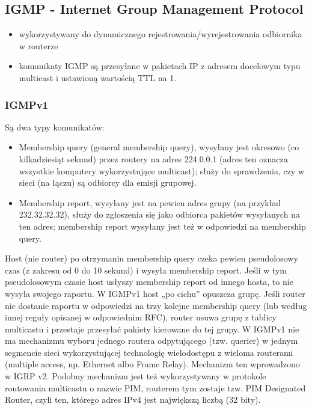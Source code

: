 \documentclass[../main.tex]{subfiles}
\begin{document}
    \subsection{IGMP - Internet Group Management Protocol}
    \begin{itemize}
        \item wykorzystywany do dynamicznego rejestrowania/wyrejestrowania
        odbiornika w routerze
        \item komunikaty IGMP są przesyłane w pakietach IP z adresem docelowym typu multicast i
        ustawioną wartością TTL na 1.
    \end{itemize}


    \subsubsection{IGMPv1}

    Są dwa typy komunikatów:
    \begin{itemize}
        \item Membership query (general membership query), wysyłany jest okresowo (co
        kilkadziesiąt sekund) przez routery na adres 224.0.0.1 (adres ten oznacza wszystkie
        komputery wykorzystujące multicast); służy do sprawdzenia, czy w sieci (na łączu) są
        odbiorcy dla emisji grupowej.
        \item Membership report, wysyłany jest na pewien adres grupy (na przykład 232.32.32.32),
        służy do zgłoszenia się jako odbiorca pakietów wysyłanych na ten adres; membership
        report wysyłany jest też w odpowiedzi na membership query.
    \end{itemize}


    Host (nie router) po otrzymaniu membership query czeka pewien pseudolosowy czas (z
    zakresu od 0 do 10 sekund) i wysyła membership report. Jeśli w tym pseudolosowym czasie
    host usłyszy membership report od innego hosta, to nie wysyła swojego raportu.
    W IGMPv1 host „po cichu” opuszcza grupę. Jeśli router nie dostanie raportu w odpowiedzi
    na trzy kolejne membership query (lub według innej reguły opisanej w odpowiednim RFC),
    router usuwa grupę z tablicy multicastu i przestaje przesyłać pakiety kierowane do tej grupy.
    W IGMPv1 nie ma mechanizmu wyboru jednego routera odpytującego (tzw. querier) w
    jednym segmencie sieci wykorzystującej technologię wielodostępu z wieloma routerami
    (multiple access, np. Ethernet albo Frame Relay). Mechanizm ten wprowadzono w IGRP v2.
    Podobny mechanizm jest też wykorzystywany w protokole routowania multicastu o nazwie
    PIM, routerem tym zostaje tzw. PIM Designated Router,
    czyli ten, którego adres IPv4 jest największą liczbą (32 bity).
\end{document}
